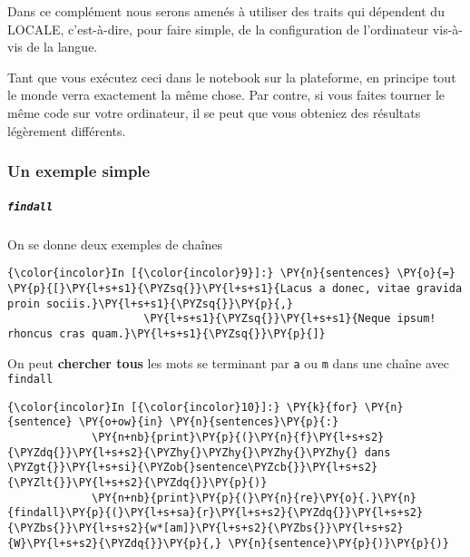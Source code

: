     Dans ce complément nous serons amenés à utiliser des traits qui
dépendent du LOCALE, c'est-à-dire, pour faire simple, de la
configuration de l'ordinateur vis-à-vis de la langue.

Tant que vous exécutez ceci dans le notebook sur la plateforme, en
principe tout le monde verra exactement la même chose. Par contre, si
vous faites tourner le même code sur votre ordinateur, il se peut que
vous obteniez des résultats légèrement différents.

    \hypertarget{un-exemple-simple}{%
\subsubsection{Un exemple simple}\label{un-exemple-simple}}

    \hypertarget{findall}{%
\subparagraph{\texorpdfstring{\texttt{findall}}{findall}}\label{findall}}

    On se donne deux exemples de chaînes

    \begin{Verbatim}[commandchars=\\\{\},frame=single,framerule=0.3mm,rulecolor=\color{cellframecolor}]
{\color{incolor}In [{\color{incolor}9}]:} \PY{n}{sentences} \PY{o}{=} \PY{p}{[}\PY{l+s+s1}{\PYZsq{}}\PY{l+s+s1}{Lacus a donec, vitae gravida proin sociis.}\PY{l+s+s1}{\PYZsq{}}\PY{p}{,} 
                     \PY{l+s+s1}{\PYZsq{}}\PY{l+s+s1}{Neque ipsum! rhoncus cras quam.}\PY{l+s+s1}{\PYZsq{}}\PY{p}{]}
\end{Verbatim}


    On peut \textbf{chercher tous} les mots se terminant par \texttt{a} ou
\texttt{m} dans une chaîne avec \texttt{findall}

    \begin{Verbatim}[commandchars=\\\{\},frame=single,framerule=0.3mm,rulecolor=\color{cellframecolor}]
{\color{incolor}In [{\color{incolor}10}]:} \PY{k}{for} \PY{n}{sentence} \PY{o+ow}{in} \PY{n}{sentences}\PY{p}{:}
             \PY{n+nb}{print}\PY{p}{(}\PY{n}{f}\PY{l+s+s2}{\PYZdq{}}\PY{l+s+s2}{\PYZhy{}\PYZhy{}\PYZhy{}\PYZhy{} dans \PYZgt{}}\PY{l+s+si}{\PYZob{}sentence\PYZcb{}}\PY{l+s+s2}{\PYZlt{}}\PY{l+s+s2}{\PYZdq{}}\PY{p}{)}
             \PY{n+nb}{print}\PY{p}{(}\PY{n}{re}\PY{o}{.}\PY{n}{findall}\PY{p}{(}\PY{l+s+sa}{r}\PY{l+s+s2}{\PYZdq{}}\PY{l+s+s2}{\PYZbs{}}\PY{l+s+s2}{w*[am]}\PY{l+s+s2}{\PYZbs{}}\PY{l+s+s2}{W}\PY{l+s+s2}{\PYZdq{}}\PY{p}{,} \PY{n}{sentence}\PY{p}{)}\PY{p}{)}
\end{Verbatim}


